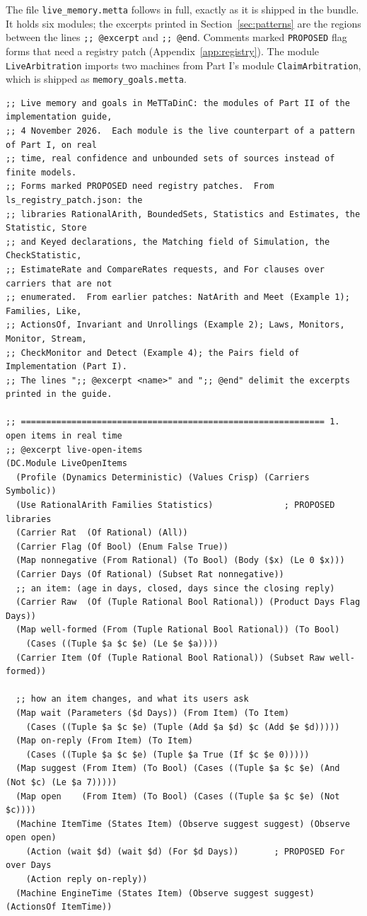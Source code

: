 \documentclass[11pt]{article}
\newcommand{\fpath}[1]{\nolinkurl{#1}}
\newcommand{\code}[1]{\texttt{#1}}
\theoremstyle{definition}
\theoremstyle{plain}
\begin{document}
The file \fpath{live_memory.metta} follows in full, exactly as it is shipped in the bundle. It holds
six modules; the excerpts printed in Section~\ref{sec:patterns} are the regions between the lines
\code{;; @excerpt} and \code{;; @end}. Comments marked \code{PROPOSED} flag forms that need a
registry patch (Appendix~\ref{app:registry}). The module \code{LiveArbitration} imports two machines
from Part I's module \code{ClaimArbitration}, which is shipped as \fpath{memory_goals.metta}.
\begin{lstlisting}[style=mettafull]
;; Live memory and goals in MeTTaDinC: the modules of Part II of the implementation guide,
;; 4 November 2026.  Each module is the live counterpart of a pattern of Part I, on real
;; time, real confidence and unbounded sets of sources instead of finite models.
;; Forms marked PROPOSED need registry patches.  From ls_registry_patch.json: the
;; libraries RationalArith, BoundedSets, Statistics and Estimates, the Statistic, Store
;; and Keyed declarations, the Matching field of Simulation, the CheckStatistic,
;; EstimateRate and CompareRates requests, and For clauses over carriers that are not
;; enumerated.  From earlier patches: NatArith and Meet (Example 1); Families, Like,
;; ActionsOf, Invariant and Unrollings (Example 2); Laws, Monitors, Monitor, Stream,
;; CheckMonitor and Detect (Example 4); the Pairs field of Implementation (Part I).
;; The lines ";; @excerpt <name>" and ";; @end" delimit the excerpts printed in the guide.

;; ============================================================ 1. open items in real time
;; @excerpt live-open-items
(DC.Module LiveOpenItems
  (Profile (Dynamics Deterministic) (Values Crisp) (Carriers Symbolic))
  (Use RationalArith Families Statistics)              ; PROPOSED libraries
  (Carrier Rat  (Of Rational) (All))
  (Carrier Flag (Of Bool) (Enum False True))
  (Map nonnegative (From Rational) (To Bool) (Body ($x) (Le 0 $x)))
  (Carrier Days (Of Rational) (Subset Rat nonnegative))
  ;; an item: (age in days, closed, days since the closing reply)
  (Carrier Raw  (Of (Tuple Rational Bool Rational)) (Product Days Flag Days))
  (Map well-formed (From (Tuple Rational Bool Rational)) (To Bool)
    (Cases ((Tuple $a $c $e) (Le $e $a))))
  (Carrier Item (Of (Tuple Rational Bool Rational)) (Subset Raw well-formed))

  ;; how an item changes, and what its users ask
  (Map wait (Parameters ($d Days)) (From Item) (To Item)
    (Cases ((Tuple $a $c $e) (Tuple (Add $a $d) $c (Add $e $d)))))
  (Map on-reply (From Item) (To Item)
    (Cases ((Tuple $a $c $e) (Tuple $a True (If $c $e 0)))))
  (Map suggest (From Item) (To Bool) (Cases ((Tuple $a $c $e) (And (Not $c) (Le $a 7)))))
  (Map open    (From Item) (To Bool) (Cases ((Tuple $a $c $e) (Not $c))))
  (Machine ItemTime (States Item) (Observe suggest suggest) (Observe open open)
    (Action (wait $d) (wait $d) (For $d Days))       ; PROPOSED For over Days
    (Action reply on-reply))
  (Machine EngineTime (States Item) (Observe suggest suggest) (ActionsOf ItemTime))


\end{lstlisting}
\end{document}
